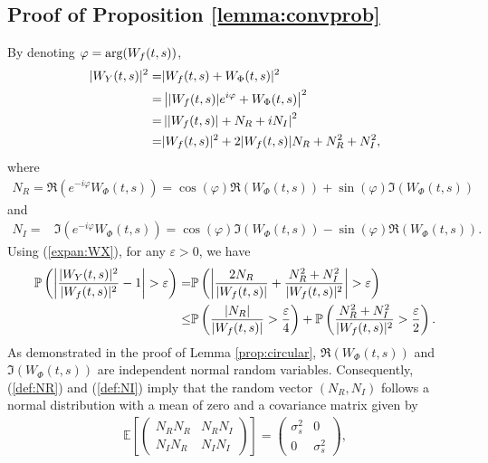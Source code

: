 \documentclass{amsart}
\begin{document}
\subsection{Proof of Proposition \ref{lemma:convprob}}\label{sec:proof:lemma:convprob}
By denoting $\varphi=\textup{arg}(W_{f}(t,s))$,
\begin{align}\label{expan:WX}
|W_{Y}(t,s)|^2
=&|W_{f}(t,s)+ W_{\Phi}(t,s)|^{2}
\\\notag=&\left||W_{f}(t,s)|e^{i\varphi}+ W_{\Phi}(t,s)\right|^{2}
\\\notag=&\left||W_{f}(t,s)|+ N_{R}+iN_{I}\right|^{2}
\\\notag=&|W_{f}(t,s)|^{2}+2|W_{f}(t,s)|N_{R} +N^{2}_{R}+N^{2}_{I},
\end{align}
where
\begin{align}\label{def:NR}
N_{R} = \Re\left(e^{-i\varphi}W_{\Phi}(t,s)\right)
=\cos(\varphi)\Re(W_{\Phi}(t,s))+\sin(\varphi)\Im(W_{\Phi}(t,s))
\end{align}
and
\begin{align}\label{def:NI}
N_{I} =& \Im\left(e^{-i\varphi}W_{\Phi}(t,s)\right)
=\cos(\varphi)\Im(W_{\Phi}(t,s))-\sin(\varphi)\Re(W_{\Phi}(t,s)).
\end{align}
Using (\ref{expan:WX}), for any $\varepsilon>0$, we have
\begin{align}\notag
\mathbb{P}\left(\left|\frac{|W_{Y}(t,s)|^2}{|W_{f}(t,s)|^2}-1\right|>\varepsilon\right)
=&\mathbb{P}\left(\left|\frac{2N_{R}}{|W_{f}(t,s)|} +\frac{N^{2}_{R}+N^{2}_{I}}{|W_{f}(t,s)|^{2}}\right|>\varepsilon\right)
\\\label{markov0}\leq&\mathbb{P}\left(\frac{|N_{R}|}{|W_{f}(t,s)|}>\frac{\varepsilon}{4}\right)
+
\mathbb{P}\left(\frac{N^{2}_{R}+N^{2}_{I}}{|W_{f}(t,s)|^{2}}>\frac{\varepsilon}{2}\right).
\end{align}
As demonstrated in the proof of Lemma \ref{prop:circular}, $\Re(W_{\Phi}(t,s))$ and $\Im(W_{\Phi}(t,s))$ are independent normal random variables. Consequently, (\ref{def:NR}) and (\ref{def:NI}) imply that
the random vector $(N_{R},N_{I})$ follows a normal distribution with a mean of zero and a covariance matrix given by
\begin{align*}%
\mathbb{E}\left[\begin{pmatrix}N_{R}N_{R} & N_{R}N_{I}\\ N_{I}N_{R} & N_{I}N_{I}\end{pmatrix}\right] =
\begin{pmatrix}\sigma_{s}^{2} & 0\\ 0 & \sigma_{s}^{2}\end{pmatrix},
\end{align*}
\end{document}
